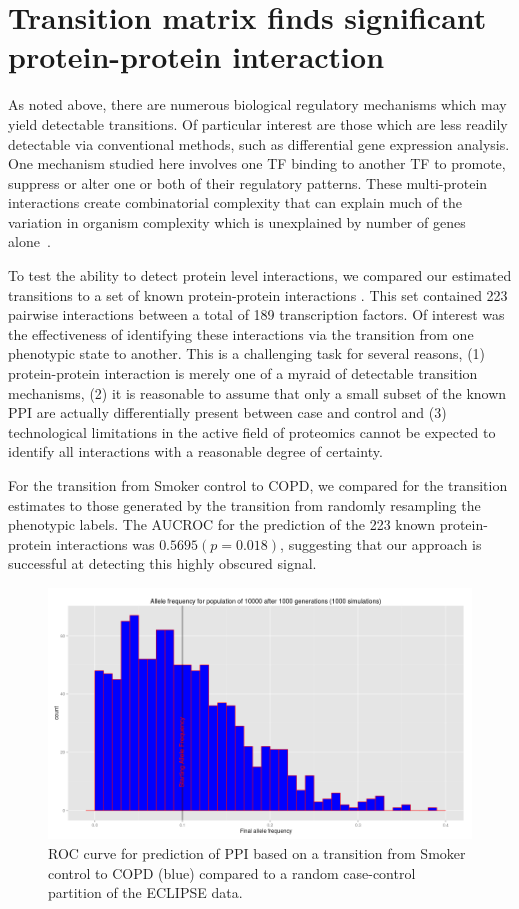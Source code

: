 \documentclass[english]{article}
\begin{document}
\section*{Transition matrix finds significant protein-protein interaction}

As noted above, there are numerous biological regulatory mechanisms
which may yield detectable transitions. Of particular interest are
those which are less readily detectable via conventional methods,
such as differential gene expression analysis. One mechanism studied
here involves one TF binding to another TF to promote, suppress or
alter one or both of their regulatory patterns. These multi-protein
interactions create combinatorial complexity that can explain much
of the variation in organism complexity which is unexplained by number
of genes alone~\cite{levine2003transcription}.

To test the ability to detect protein level interactions, we compared
our estimated transitions to a set of known protein-protein interactions
\cite{ravasi2010atlas}. This set contained 223 pairwise interactions
between a total of 189 transcription factors. Of interest was the
effectiveness of identifying these interactions via the transition
from one phenotypic state to another. This is a challenging task for
several reasons, (1) protein-protein interaction is merely one of
a myraid of detectable transition mechanisms, (2) it is reasonable
to assume that only a small subset of the known PPI are actually differentially
present between case and control and (3) technological limitations
in the active field of proteomics cannot be expected to identify all
interactions with a reasonable degree of certainty.

For the transition from Smoker control to COPD, we compared for the
transition estimates to those generated by the transition from randomly
resampling the phenotypic labels. The AUCROC for the prediction of
the 223 known protein-protein interactions was $0.5695\left(p=0.018\right)$,
suggesting that our approach is successful at detecting this highly
obscured signal.
\begin{figure}[h]
\includegraphics[width=0.5\columnwidth]{pasted9}\caption{ROC curve for prediction of PPI based on a transition from Smoker
control to COPD (blue) compared to a random case-control partition
of the ECLIPSE data.}
\end{figure}
\end{document}
